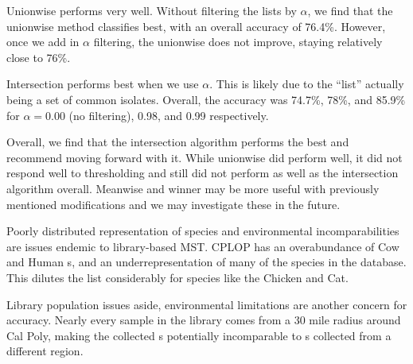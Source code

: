 Unionwise performs very well. Without filtering the \knnlong{} lists by $\alpha$, we find that the unionwise method classifies best, with an overall accuracy of 76.4\%. However, once we add in $\alpha$ filtering, the unionwise does not improve, staying relatively close to 76\%. 

Intersection performs best when we use $\alpha$. This is likely due to the ``list'' actually being a set of common isolates. Overall, the accuracy was 74.7\%, 78\%, and 85.9\% for $\alpha = $0.00 (no filtering), 0.98, and 0.99 respectively. 

Overall, we find that the intersection algorithm performs the best and recommend moving forward with it. While unionwise did perform well, it did not respond well to thresholding and still did not perform as well as the intersection algorithm overall. Meanwise and winner may be more useful with previously mentioned modifications and we may investigate these in the future.


Poorly distributed representation of species and environmental incomparabilities are issues endemic to library-based MST. CPLOP has an overabundance of Cow and Human \isol{}s, and an underrepresentation of many of the species in the database. This dilutes the \knnlong{} list considerably for species like the Chicken and Cat. 

Library population issues aside, environmental limitations are another concern for accuracy. Nearly every sample in the library comes from a 30 mile radius around Cal Poly, making the collected \pyro{}s potentially incomparable to \pyro{}s collected from a different region.


